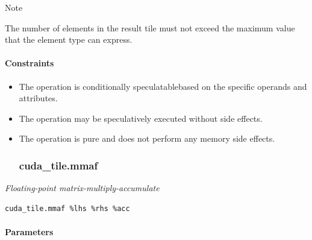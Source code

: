 \documentclass{article}
\begin{document}
Note


The number of elements in the result tile must not exceed the maximum value that the element type can express.



\paragraph{Constraints}

\begin{itemize}
\item The operation is conditionally speculatablebased on the specific operands and attributes.
\item The operation may be speculatively executed without side effects.
\item The operation is pure and does not perform any memory side effects.


\subsubsection{cuda\_tile.mmaf}

\end{itemize}
\textit{Floating-point matrix-multiply-accumulate}


\begin{lstlisting}
cuda_tile.mmaf %lhs %rhs %acc
\end{lstlisting}

\paragraph{Parameters}
\end{document}
